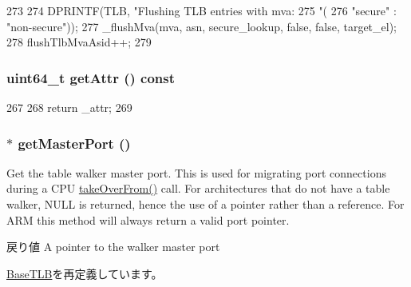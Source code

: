 \begin{DoxyCode}
273 {
274     DPRINTF(TLB, "Flushing TLB entries with mva: %
275             "(%
276             "secure" : "non-secure"));
277     _flushMva(mva, asn, secure_lookup, false, false, target_el);
278     flushTlbMvaAsid++;
279 }
\end{DoxyCode}
\hypertarget{classArmISA_1_1TLB_abe784aff035154580e3b0fc0f5af8bd5}{
\subsubsection[{getAttr}]{\setlength{\rightskip}{0pt plus 5cm}uint64\_\-t getAttr () const}}
\label{classArmISA_1_1TLB_abe784aff035154580e3b0fc0f5af8bd5}



\begin{DoxyCode}
267     {
268         return _attr;
269     }
\end{DoxyCode}
\hypertarget{classArmISA_1_1TLB_a2ea87b216b1f58953a679590672be258}{
\subsubsection[{getMasterPort}]{ $\ast$ getMasterPort ()}}
\label{classArmISA_1_1TLB_a2ea87b216b1f58953a679590672be258}
Get the table walker master port. This is used for migrating port connections during a CPU \hyperlink{classArmISA_1_1TLB_a15b6c15c1be2ca4de3e65772a02aa29f}{takeOverFrom()} call. For architectures that do not have a table walker, NULL is returned, hence the use of a pointer rather than a reference. For ARM this method will always return a valid port pointer.

\begin{DoxyReturn}{戻り値}
A pointer to the walker master port 
\end{DoxyReturn}


\hyperlink{classBaseTLB_a5125451589673cb85c7cab06c2ac5434}{BaseTLB}を再定義しています。


